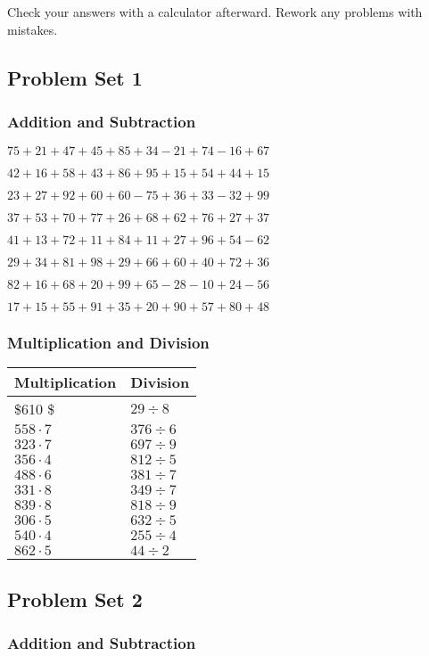 Check your answers with a calculator afterward. Rework any problems with
mistakes.

\hypertarget{problem-set-1}{%
\subsection{Problem Set 1}\label{problem-set-1}}

\hypertarget{addition-and-subtraction}{%
\subsubsection{Addition and
Subtraction}\label{addition-and-subtraction}}

\(75+21+47+45+85+34-21+74-16+67\)

\(42+16+58+43+86+95+15+54+44+15\)

\(23+27+92+60+60-75+36+33-32+99\)

\(37+53+70+77+26+68+62+76+27+37\)

\(41+13+72+11+84+11+27+96+54-62\)

\(29+34+81+98+29+66+60+40+72+36\)

\(82+16+68+20+99+65-28-10+24-56\)

\(17+15+55+91+35+20+90+57+80+48\)

\hypertarget{multiplication-and-division}{%
\subsubsection{Multiplication and
Division}\label{multiplication-and-division}}

\begin{longtable}[]{@{}ll@{}}
\toprule
Multiplication & Division\tabularnewline
\midrule
\endhead
\$610\cdot8 \$ & \(29÷8\)\tabularnewline
\(558\cdot7\) & \(376÷6\)\tabularnewline
\(323\cdot7\) & \(697÷9\)\tabularnewline
\(356\cdot4\) & \(812÷5\)\tabularnewline
\(488\cdot6\) & \(381÷7\)\tabularnewline
\(331\cdot8\) & \(349÷7\)\tabularnewline
\(839\cdot8\) & \(818÷9\)\tabularnewline
\(306\cdot5\) & \(632÷5\)\tabularnewline
\(540\cdot4\) & \(255÷4\)\tabularnewline
\(862\cdot5\) & \(44÷2\)\tabularnewline
\bottomrule
\end{longtable}

\hypertarget{problem-set-2}{%
\subsection{Problem Set 2}\label{problem-set-2}}

\hypertarget{addition-and-subtraction-1}{%
\subsubsection{Addition and
Subtraction}\label{addition-and-subtraction-1}}


